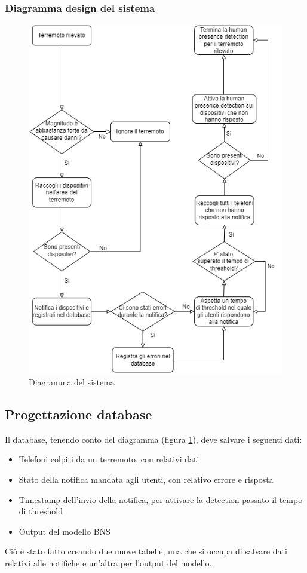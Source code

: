 \documentclass[main.tex]{subfiles}
\begin{document}
\subsubsection{Diagramma design del sistema}
\begin{figure}[H]
    \centering
    \includegraphics[width=1\linewidth]{img/Post-Earthquake/Post-EQ-Detection-Diagram-flow chart diagram ITA.png}
    \caption{Diagramma del sistema}
    \label{fig:system-diagram}
\end{figure}

\subsection{Progettazione database}
Il database, tenendo conto del diagramma (figura \ref{fig:system-diagram}), deve salvare i seguenti dati:
\begin{itemize}
    \item Telefoni colpiti da un terremoto, con relativi dati
    \item Stato della notifica mandata agli utenti, con relativo errore e risposta
    \item Timestamp dell'invio della notifica, per attivare la detection passato il tempo di threshold
    \item Output del modello BNS
\end{itemize}
Ciò è stato fatto creando due nuove tabelle, una che si occupa di salvare dati relativi alle notifiche e un'altra per l'output del modello.
\end{document}
